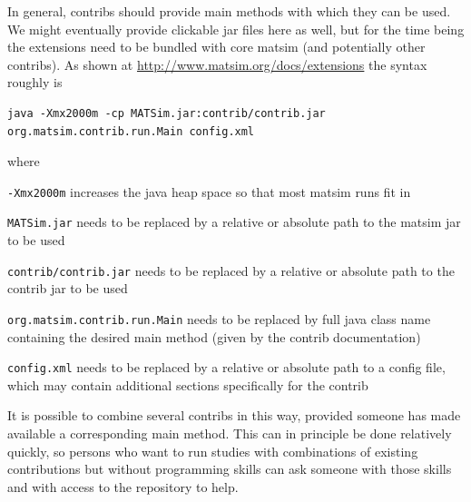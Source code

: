 In general, contribs should provide main methods with which they can be used.  We might eventually provide clickable jar files here as well, but for the time being the extensions need to be bundled with core \gls{matsim} (and potentially other contribs). As shown at \url{http://www.matsim.org/docs/extensions} the syntax roughly is
\begin{lstlisting}
java -Xmx2000m -cp MATSim.jar:contrib/contrib.jar org.matsim.contrib.run.Main config.xml  
\end{lstlisting}
 
where
\begin{compactitem}
\item \lstinline$-Xmx2000m$ increases the \gls{java} heap space so that most \gls{matsim} runs fit in
\item \lstinline$MATSim.jar$ needs to be replaced by a relative or absolute path to the \gls{matsim} jar to be used
\item \lstinline$contrib/contrib.jar$ needs to be replaced by a relative or absolute path to the contrib jar to be used
\item \lstinline$org.matsim.contrib.run.Main$ needs to be replaced by full java class name containing the desired main method (given by the contrib documentation)
\item \lstinline$config.xml$ needs to be replaced by a relative or absolute path to a config file, which may contain additional sections specifically for the contrib
\end{compactitem}

It is possible to combine several contribs in this way, provided someone has made available a corresponding main method.  This can in principle be done relatively quickly, so persons who want to run studies with combinations of existing contributions but without programming skills can ask someone with those skills and with access to the repository to help.

